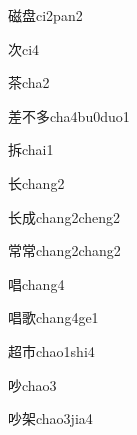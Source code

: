 \begin{verbete}[14;11]{磁盘}{ci2pan2}
\end{verbete}

\begin{verbete}[6]{次}{ci4}
\end{verbete}

\begin{verbete}[9]{茶}{cha2}
\end{verbete}

\begin{verbete}[9;4;6]{差不多}{cha4bu0duo1}
\end{verbete}

\begin{verbete}[8]{拆}{chai1}
\end{verbete}

\begin{verbete}[4]{长}{chang2}
\end{verbete}

\begin{verbete}[4;6]{长成}{chang2cheng2}
\end{verbete}

\begin{verbete}[11;11]{常常}{chang2chang2}
\end{verbete}

\begin{verbete}[11]{唱}{chang4}
\end{verbete}

\begin{verbete}[11;14]{唱歌}{chang4ge1}
\end{verbete}

\begin{verbete}[12;5]{超市}{chao1shi4}
\end{verbete}

\begin{verbete}[7]{吵}{chao3}
\end{verbete}

\begin{verbete}[7;9]{吵架}{chao3jia4}
\end{verbete}

